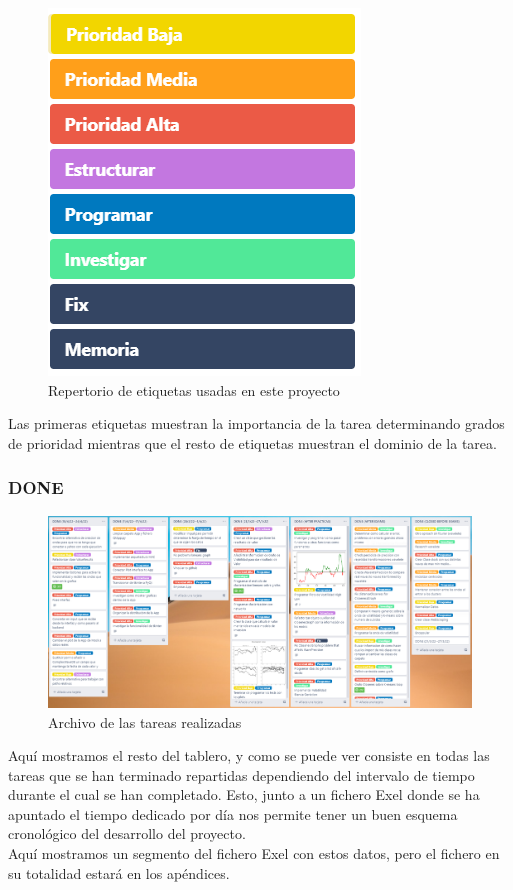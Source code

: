 \documentclass[12pt,a4paper]{article}
\begin{document}
\begin{figure}[H]
\centering
  \centering
  \includegraphics[width=0.5\linewidth]{trello etiquetas}
\caption{Repertorio de etiquetas usadas en este proyecto}
\label{fig:subrgrafo}
\end{figure}
	Las primeras etiquetas muestran la importancia de la tarea determinando grados de prioridad mientras que el resto de etiquetas muestran el dominio de la tarea.	\subsubsection{DONE}
\begin{figure}[H]
\centering
  \centering
  \includegraphics[width=1\linewidth]{trello done}
\caption{Archivo de las tareas realizadas}
\label{fig:subrgrafo}
\end{figure}
Aquí mostramos el resto del tablero, y como se puede ver consiste en todas las tareas que se han terminado repartidas dependiendo del intervalo de tiempo durante el cual se han completado. Esto, junto a un fichero Exel donde se ha apuntado el tiempo dedicado por día nos permite tener un buen esquema cronológico del desarrollo del proyecto.\\
Aquí mostramos un segmento del fichero Exel con estos datos, pero el fichero en su totalidad estará en los apéndices.\\
\end{document}
